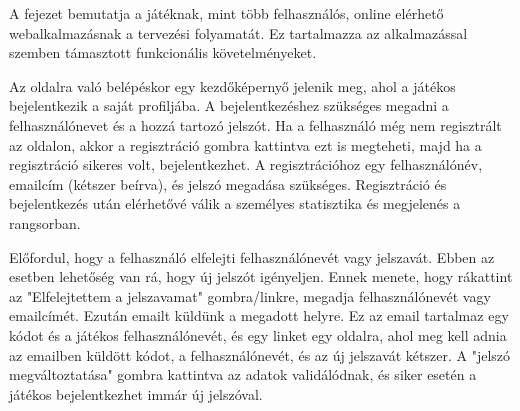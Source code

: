 









A fejezet bemutatja a játéknak, mint több felhasználós, online elérhető webalkalmazásnak a tervezési folyamatát. Ez tartalmazza az alkalmazással szemben támasztott funkcionális követelményeket.


Az oldalra való belépéskor egy kezdőképernyő jelenik meg, ahol a játékos bejelentkezik a saját profiljába. A bejelentkezéshez szükséges megadni a felhasználónevet és a hozzá tartozó jelszót. Ha a felhasználó még nem regisztrált az oldalon, akkor a regisztráció gombra kattintva ezt is megteheti, majd ha a regisztráció sikeres volt, bejelentkezhet. A regisztrációhoz egy felhasználónév, emailcím (kétszer beírva), és jelszó megadása szükséges. Regisztráció és bejelentkezés után elérhetővé válik a személyes statisztika és megjelenés a rangsorban.

Előfordul, hogy a felhasználó elfelejti felhasználónevét vagy jelszavát. Ebben az esetben lehetőség van rá, hogy új jelszót igényeljen. Ennek menete, hogy rákattint az "Elfelejtettem a jelszavamat" gombra/linkre, megadja felhasználónevét vagy emailcímét. Ezután emailt küldünk a megadott helyre. Ez az email tartalmaz egy kódot és a játékos felhasználónevét, és egy linket egy oldalra, ahol meg kell adnia az emailben küldött kódot, a felhasználónevét, és az új jelszavát kétszer. A "jelszó megváltoztatása" gombra kattintva az adatok validálódnak, és siker esetén a játékos bejelentkezhet immár új jelszóval.

